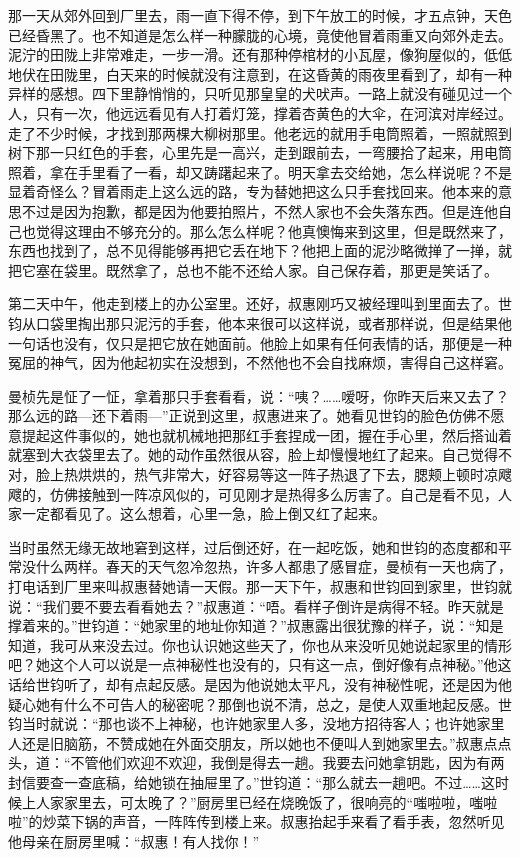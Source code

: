 \par 那一天从郊外回到厂里去，雨一直下得不停，到下午放工的时候，才五点钟，天色已经昏黑了。也不知道是怎么样一种朦胧的心境，竟使他冒着雨重又向郊外走去。泥泞的田陇上非常难走，一步一滑。还有那种停棺材的小瓦屋，像狗屋似的，低低地伏在田陇里，白天来的时候就没有注意到，在这昏黄的雨夜里看到了，却有一种异样的感想。四下里静悄悄的，只听见那皇皇的犬吠声。一路上就没有碰见过一个人，只有一次，他远远看见有人打着灯笼，撑着杏黄色的大伞，在河滨对岸经过。走了不少时候，才找到那两棵大柳树那里。他老远的就用手电筒照着，一照就照到树下那一只红色的手套，心里先是一高兴，走到跟前去，一弯腰拾了起来，用电筒照着，拿在手里看了一看，却又踌躇起来了。明天拿去交给她，怎么样说呢？不是显着奇怪么？冒着雨走上这么远的路，专为替她把这么只手套找回来。他本来的意思不过是因为抱歉，都是因为他要拍照片，不然人家也不会失落东西。但是连他自己也觉得这理由不够充分的。那么怎么样呢？他真懊悔来到这里，但是既然来了，东西也找到了，总不见得能够再把它丢在地下？他把上面的泥沙略微掸了一掸，就把它塞在袋里。既然拿了，总也不能不还给人家。自己保存着，那更是笑话了。
\par 第二天中午，他走到楼上的办公室里。还好，叔惠刚巧又被经理叫到里面去了。世钧从口袋里掏出那只泥污的手套，他本来很可以这样说，或者那样说，但是结果他一句话也没有，仅只是把它放在她面前。他脸上如果有任何表情的话，那便是一种冤屈的神气，因为他起初实在没想到，不然他也不会自找麻烦，害得自己这样窘。
\par 曼桢先是怔了一怔，拿着那只手套看看，说：“咦？……嗳呀，你昨天后来又去了？那么远的路—还下着雨—”正说到这里，叔惠进来了。她看见世钧的脸色仿佛不愿意提起这件事似的，她也就机械地把那红手套捏成一团，握在手心里，然后搭讪着就塞到大衣袋里去了。她的动作虽然很从容，脸上却慢慢地红了起来。自己觉得不对，脸上热烘烘的，热气非常大，好容易等这一阵子热退了下去，腮颊上顿时凉飕飕的，仿佛接触到一阵凉风似的，可见刚才是热得多么厉害了。自己是看不见，人家一定都看见了。这么想着，心里一急，脸上倒又红了起来。
\par 当时虽然无缘无故地窘到这样，过后倒还好，在一起吃饭，她和世钧的态度都和平常没什么两样。春天的天气忽冷忽热，许多人都患了感冒症，曼桢有一天也病了，打电话到厂里来叫叔惠替她请一天假。那一天下午，叔惠和世钧回到家里，世钧就说：“我们要不要去看看她去？”叔惠道：“唔。看样子倒许是病得不轻。昨天就是撑着来的。”世钧道：“她家里的地址你知道？”叔惠露出很犹豫的样子，说：“知是知道，我可从来没去过。你也认识她这些天了，你也从来没听见她说起家里的情形吧？她这个人可以说是一点神秘性也没有的，只有这一点，倒好像有点神秘。”他这话给世钧听了，却有点起反感。是因为他说她太平凡，没有神秘性呢，还是因为他疑心她有什么不可告人的秘密呢？那倒也说不清，总之，是使人双重地起反感。世钧当时就说：“那也谈不上神秘，也许她家里人多，没地方招待客人；也许她家里人还是旧脑筋，不赞成她在外面交朋友，所以她也不便叫人到她家里去。”叔惠点点头，道：“不管他们欢迎不欢迎，我倒是得去一趟。我要去问她拿钥匙，因为有两封信要查一查底稿，给她锁在抽屉里了。”世钧道：“那么就去一趟吧。不过……这时候上人家家里去，可太晚了？”厨房里已经在烧晚饭了，很响亮的“嗤啦啦，嗤啦啦”的炒菜下锅的声音，一阵阵传到楼上来。叔惠抬起手来看了看手表，忽然听见他母亲在厨房里喊：“叔惠！有人找你！”
